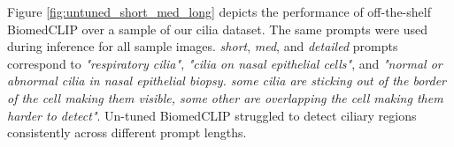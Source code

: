 \documentclass[./dissertation.tex]{subfiles}
\begin{document}





Figure \ref{fig:untuned_short_med_long} depicts the performance of off-the-shelf BiomedCLIP over a sample of our cilia dataset. The same prompts were used during inference for all sample images. \textit{short}, \textit{med}, and \textit{detailed} prompts correspond to \textit{"respiratory cilia"}, \textit{"cilia on nasal epithelial cells"}, and \textit{"normal or abnormal cilia in nasal epithelial biopsy. some cilia are sticking out of the border of the cell making them visible, some other are overlapping the cell making them harder to detect"}. Un-tuned BiomedCLIP struggled to detect ciliary regions consistently across different prompt lengths.
\end{document}
